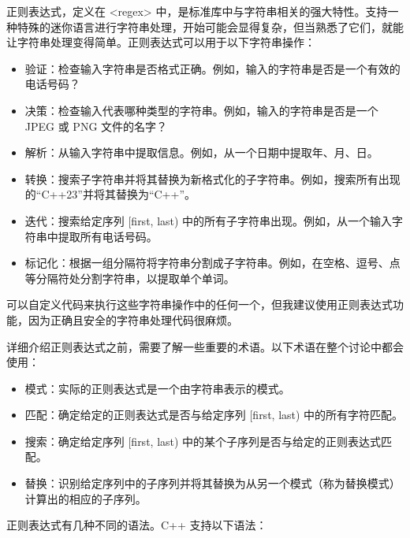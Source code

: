 
正则表达式，定义在 <regex> 中，是标准库中与字符串相关的强大特性。支持一种特殊的迷你语言进行字符串处理，开始可能会显得复杂，但当熟悉了它们，就能让字符串处理变得简单。正则表达式可以用于以下字符串操作：

\begin{itemize}
\item
验证：检查输入字符串是否格式正确。例如，输入的字符串是否是一个有效的电话号码？

\item
决策：检查输入代表哪种类型的字符串。例如，输入的字符串是否是一个 JPEG 或 PNG 文件的名字？

\item
解析：从输入字符串中提取信息。例如，从一个日期中提取年、月、日。

\item
转换：搜索子字符串并将其替换为新格式化的子字符串。例如，搜索所有出现的“C++23”并将其替换为“C++”。

\item
迭代：搜索给定序列 [first, last) 中的所有子字符串出现。例如，从一个输入字符串中提取所有电话号码。

\item
标记化：根据一组分隔符将字符串分割成子字符串。例如，在空格、逗号、点等分隔符处分割字符串，以提取单个单词。
\end{itemize}

可以自定义代码来执行这些字符串操作中的任何一个，但我建议使用正则表达式功能，因为正确且安全的字符串处理代码很麻烦。

详细介绍正则表达式之前，需要了解一些重要的术语。以下术语在整个讨论中都会使用：

\begin{itemize}
\item
模式：实际的正则表达式是一个由字符串表示的模式。

\item
匹配：确定给定的正则表达式是否与给定序列 [first, last) 中的所有字符匹配。

\item
搜索：确定给定序列 [first, last) 中的某个子序列是否与给定的正则表达式匹配。

\item
替换：识别给定序列中的子序列并将其替换为从另一个模式（称为替换模式）计算出的相应的子序列。
\end{itemize}

正则表达式有几种不同的语法。C++ 支持以下语法：

